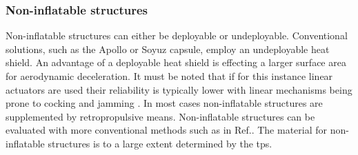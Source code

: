 \subsubsection{Non-inflatable structures}
Non-inflatable structures can either be deployable or undeployable. Conventional solutions, such as the Apollo or Soyuz capsule, employ an undeployable heat shield. An advantage of a deployable heat shield is effecting a larger surface area for aerodynamic deceleration. It must be noted that if for this instance linear actuators are used their reliability is typically lower with linear mechanisms being prone to cocking and jamming \cite[p.683]{Wertz2011}. In most cases non-inflatable structures are supplemented by retropropulsive means. Non-inflatable structures can be evaluated with more conventional methods such as in Ref.\cite{Megson2012}. The material for non-inflatable structures is to a large extent determined by the \gls{tps}. 











